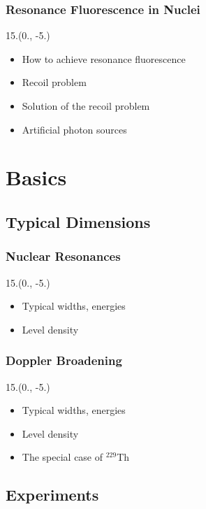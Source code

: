 \documentclass{beamer}
\begin{document}
\begin{frame}
    \frametitle{Resonance Fluorescence in Nuclei}
    \begin{textblock}{15.}(0., -5.)
        \begin{itemize}
            \item How to achieve resonance fluorescence
            \item Recoil problem
            \item Solution of the recoil problem
            \item Artificial photon sources
        \end{itemize}
    \end{textblock}
\end{frame}

\section{Basics}

\subsection{Typical Dimensions}

\begin{frame}
    \frametitle{Nuclear Resonances}
    \begin{textblock}{15.}(0., -5.)
        \begin{itemize}
            \item Typical widths, energies
            \item Level density
        \end{itemize}
    \end{textblock}
\end{frame}

\begin{frame}
    \frametitle{Doppler Broadening}
    \begin{textblock}{15.}(0., -5.)
        \begin{itemize}
            \item Typical widths, energies
            \item Level density
            \item The special case of $^{229}$Th
        \end{itemize}
    \end{textblock}
\end{frame}

\subsection{Experiments}
\end{document}
